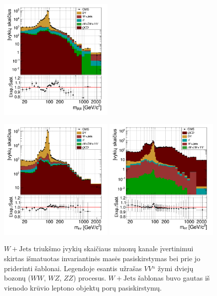 \documentclass[a4paper, 12pt, oneside]{article}
\newcommand{\ZZ}{Z\! Z}
\newcommand{\WZ}{W\! Z}
\newcommand{\WJets}{W\! +\!\mathrm{Jets}}
\newcommand{\ltq}[1]{{\quotedblbase{}#1\textquotedblleft{}}}
\newlength\q
\begin{document}
\begin{figure}[b!]
	\RawFloats\centering
	\includegraphics[width=0.49\textwidth]{Magistrinis/WJETmu_fit.png}
	\caption{\label{fig:MassmumuFit}
		$\WJets$ triukšmo įvykių skaičiaus miuonų kanale įvertinimui skirtas išmatuotas invariantinės masės pasiskirstymas bei prie
		jo priderinti šablonai.
		Legendoje esantis užrašas \ltq{$V\!V$} žymi dviejų bozonų ($WW$, $\WZ$, $\ZZ$) procesus.
		$\WJets$ šablonas buvo gautas iš vienodo krūvio leptono objektų porų pasiskirstymų.}
\vspace{1cm}
	\includegraphics[width=0.49\textwidth]{Magistrinis/WJETe_fit.png}
	\includegraphics[width=0.49\textwidth]{Magistrinis/QCDe_fit.png}

\end{figure}
\end{document}
